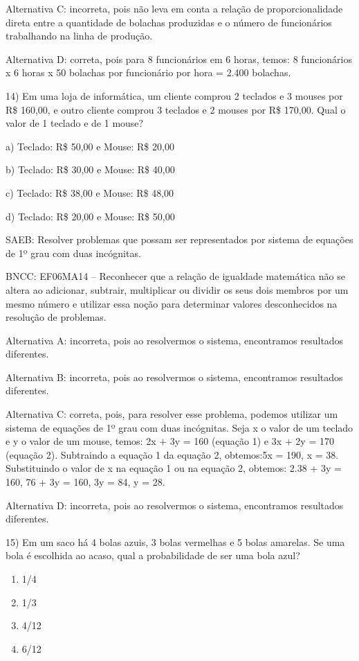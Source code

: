 Alternativa C: incorreta, pois não leva em conta a relação de
proporcionalidade direta entre a quantidade de bolachas produzidas e o
número de funcionários trabalhando na linha de produção.

Alternativa D: correta, pois para 8 funcionários em 6 horas, temos: 8
funcionários x 6 horas x 50 bolachas por funcionário por hora = 2.400
bolachas.

14) Em uma loja de informática, um cliente comprou 2 teclados e 3 mouses
por R\$ 160,00, e outro cliente comprou 3 teclados e 2 mouses por R\$
170,00. Qual o valor de 1 teclado e de 1 mouse?

a) Teclado: R\$ 50,00 e Mouse: R\$ 20,00

b) Teclado: R\$ 30,00 e Mouse: R\$ 40,00

c) Teclado: R\$ 38,00 e Mouse: R\$ 48,00

d) Teclado: R\$ 20,00 e Mouse: R\$ 50,00

SAEB: Resolver problemas que possam ser representados por sistema de
equações de 1º grau com duas incógnitas.

BNCC: EF06MA14 -- Reconhecer que a relação de igualdade matemática não
se altera ao adicionar, subtrair, multiplicar ou dividir os seus dois
membros por um mesmo número e utilizar essa noção para determinar
valores desconhecidos na resolução de problemas.

Alternativa A: incorreta, pois ao resolvermos o sistema, encontramos
resultados diferentes.

Alternativa B: incorreta, pois ao resolvermos o sistema, encontramos
resultados diferentes.

Alternativa C: correta, pois, para resolver esse problema, podemos
utilizar um sistema de equações de 1º grau com duas incógnitas. Seja x o
valor de um teclado e y o valor de um mouse, temos: 2x + 3y = 160
(equação 1) e 3x + 2y = 170 (equação 2). Subtraindo a equação 1 da
equação 2, obtemos:5x = 190, x = 38. Substituindo o valor de x na
equação 1 ou na equação 2, obtemos: 2.38 + 3y = 160, 76 + 3y = 160, 3y =
84, y = 28.

Alternativa D: incorreta, pois ao resolvermos o sistema, encontramos
resultados diferentes.

15) Em um saco há 4 bolas azuis, 3 bolas vermelhas e 5 bolas amarelas.
Se uma bola é escolhida ao acaso, qual a probabilidade de ser uma bola
azul?

\begin{enumerate}
\def\labelenumi{\alph{enumi})}
\tightlist
\item
  1/4
\item
  1/3
\item
  4/12
\item
  6/12
\end{enumerate}

